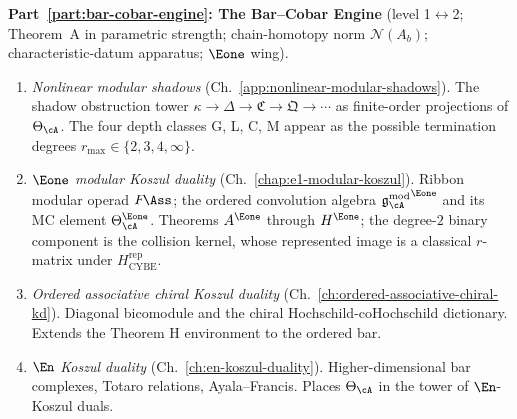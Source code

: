 \textbf{Part~\ref{part:bar-cobar-engine}: The Bar--Cobar Engine} (level 1$\leftrightarrow$2; Theorem~A in parametric strength; chain-homotopy norm $\mathcal N(A_b)$; characteristic-datum apparatus; $\Eone$ wing).
\begin{enumerate}[label=\textup{\arabic*.}, start=12]
\item \emph{Nonlinear modular shadows}
 (Ch.~\ref{app:nonlinear-modular-shadows}).
 The shadow obstruction tower
 $\kappa \to \Delta \to \mathfrak{C} \to \mathfrak{Q} \to \cdots$
 as finite-order projections of $\Theta_\cA$. The four depth
 classes G, L, C, M appear as the possible termination degrees
 $r_{\max} \in \{2, 3, 4, \infty\}$.

\item \emph{$\Eone$ modular Koszul duality}
 (Ch.~\ref{chap:e1-modular-koszul}).
 Ribbon modular operad $F\!\Ass$; the ordered convolution algebra
 ${\gAmod}^{\Eone}$ and its MC element
 $\Theta_\cA^{\Eone}$. Theorems $A^{\Eone}$ through $H^{\Eone}$;
 the degree-$2$ binary component is the collision kernel, whose
 represented image is a classical $r$-matrix under
 $H_{\mathrm{CYBE}}^{\mathrm{rep}}$.

\item \emph{Ordered associative chiral Koszul duality}
 (Ch.~\ref{ch:ordered-associative-chiral-kd}).
 Diagonal bicomodule and the chiral Hochschild-coHochschild dictionary.
 Extends the Theorem H environment to the ordered bar.

\item \emph{$\En$ Koszul duality}
 (Ch.~\ref{ch:en-koszul-duality}).
 Higher-dimensional bar complexes, Totaro relations, Ayala--Francis.
 Places $\Theta_\cA$ in the tower of $\En$-Koszul duals.
\end{enumerate}

